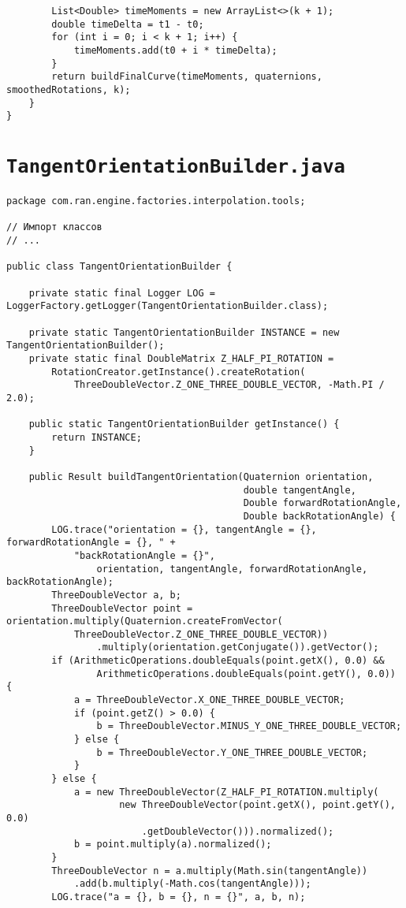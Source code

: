 \begin{verbatim}
        List<Double> timeMoments = new ArrayList<>(k + 1);
        double timeDelta = t1 - t0;
        for (int i = 0; i < k + 1; i++) {
            timeMoments.add(t0 + i * timeDelta);
        }
        return buildFinalCurve(timeMoments, quaternions, smoothedRotations, k);
    }
}
\end{verbatim}

\section*{\texttt{TangentOrientationBuilder.java}}
\begin{verbatim}
package com.ran.engine.factories.interpolation.tools;

// Импорт классов
// ...

public class TangentOrientationBuilder {

    private static final Logger LOG = LoggerFactory.getLogger(TangentOrientationBuilder.class);

    private static TangentOrientationBuilder INSTANCE = new TangentOrientationBuilder();
    private static final DoubleMatrix Z_HALF_PI_ROTATION =
        RotationCreator.getInstance().createRotation(
            ThreeDoubleVector.Z_ONE_THREE_DOUBLE_VECTOR, -Math.PI / 2.0);

    public static TangentOrientationBuilder getInstance() {
        return INSTANCE;
    }

    public Result buildTangentOrientation(Quaternion orientation,
                                          double tangentAngle,
                                          Double forwardRotationAngle,
                                          Double backRotationAngle) {
        LOG.trace("orientation = {}, tangentAngle = {}, forwardRotationAngle = {}, " +
            "backRotationAngle = {}",
                orientation, tangentAngle, forwardRotationAngle, backRotationAngle);
        ThreeDoubleVector a, b;
        ThreeDoubleVector point = orientation.multiply(Quaternion.createFromVector(
            ThreeDoubleVector.Z_ONE_THREE_DOUBLE_VECTOR))
                .multiply(orientation.getConjugate()).getVector();
        if (ArithmeticOperations.doubleEquals(point.getX(), 0.0) &&
                ArithmeticOperations.doubleEquals(point.getY(), 0.0)) {
            a = ThreeDoubleVector.X_ONE_THREE_DOUBLE_VECTOR;
            if (point.getZ() > 0.0) {
                b = ThreeDoubleVector.MINUS_Y_ONE_THREE_DOUBLE_VECTOR;
            } else {
                b = ThreeDoubleVector.Y_ONE_THREE_DOUBLE_VECTOR;
            }
        } else {
            a = new ThreeDoubleVector(Z_HALF_PI_ROTATION.multiply(
                    new ThreeDoubleVector(point.getX(), point.getY(), 0.0)
                        .getDoubleVector())).normalized();
            b = point.multiply(a).normalized();
        }
        ThreeDoubleVector n = a.multiply(Math.sin(tangentAngle))
            .add(b.multiply(-Math.cos(tangentAngle)));
        LOG.trace("a = {}, b = {}, n = {}", a, b, n);


\end{verbatim}
